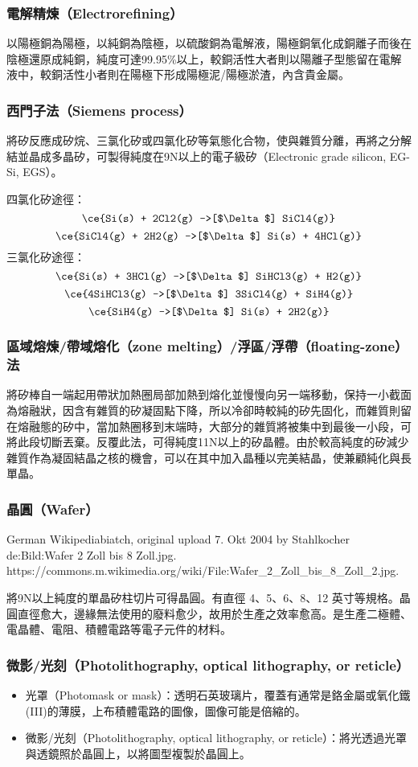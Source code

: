 \documentclass[a4paper,12pt]{report}
\begin{document}
\begin{itemize}
\begin{itemize}
\subsubsection{電解精煉（Electrorefining）}
以陽極銅為陽極，以純銅為陰極，以硫酸銅為電解液，陽極銅氧化成銅離子而後在陰極還原成純銅，純度可達99.95\%以上，較銅活性大者則以陽離子型態留在電解液中，較銅活性小者則在陽極下形成陽極泥/陽極淤渣，內含貴金屬。
\subsubsection{西門子法（Siemens process）}
將矽反應成矽烷、三氯化矽或四氯化矽等氣態化合物，使與雜質分離，再將之分解結並晶成多晶矽，可製得純度在9N以上的電子級矽（Electronic grade silicon, EG-Si, EGS）。

四氯化矽途徑：
\[\ce{Si(s) + 2Cl2(g) ->[$\Delta$] SiCl4(g)}\]
\[\ce{SiCl4(g) + 2H2(g) ->[$\Delta$] Si(s) + 4HCl(g)}\]
三氯化矽途徑：
\[\ce{Si(s) + 3HCl(g) ->[$\Delta$] SiHCl3(g) + H2(g)}\]
\[\ce{4SiHCl3(g) ->[$\Delta$] 3SiCl4(g) + SiH4(g)}\]
\[\ce{SiH4(g) ->[$\Delta$] Si(s) + 2H2(g)}\]
\subsubsection{區域熔煉/帶域熔化（zone melting）/浮區/浮帶（floating-zone）法}
將矽棒自一端起用帶狀加熱圈局部加熱到熔化並慢慢向另一端移動，保持一小截面為熔融狀，因含有雜質的矽凝固點下降，所以冷卻時較純的矽先固化，而雜質則留在熔融態的矽中，當加熱圈移到末端時，大部分的雜質將被集中到最後一小段，可將此段切斷丟棄。反覆此法，可得純度11N以上的矽晶體。由於較高純度的矽減少雜質作為凝固結晶之核的機會，可以在其中加入晶種以完美結晶，使兼顧純化與長單晶。
\subsubsection{晶圓（Wafer）}
\bct\bfH\ctr{}\caption{German Wikipediabiatch, original upload 7. Okt 2004 by Stahlkocher de:Bild:Wafer 2 Zoll bis 8 Zoll.jpg. https://commons.m.wikimedia.org/wiki/File:Wafer\_2\_Zoll\_bis\_8\_Zoll\_2.jpg.}\ef\FB\ect
將9N以上純度的單晶矽柱切片可得晶圓。有直徑 4、5、6、8、12 英寸等規格。晶圓直徑愈大，邊緣無法使用的廢料愈少，故用於生產之效率愈高。是生產二極體、電晶體、電阻、積體電路等電子元件的材料。
\subsubsection{微影/光刻（Photolithography, optical lithography, or reticle）}
\begin{itemize}
\item 光罩（Photomask or mask）：透明石英玻璃片，覆蓋有通常是鉻金屬或氧化鐵(III)的薄膜，上布積體電路的圖像，圖像可能是倍縮的。
\item 微影/光刻（Photolithography, optical lithography, or reticle）：將光透過光罩與透鏡照於晶圓上，以將圖型複製於晶圓上。
\end{itemize}

\end{itemize}
\end{itemize}
\end{document}
